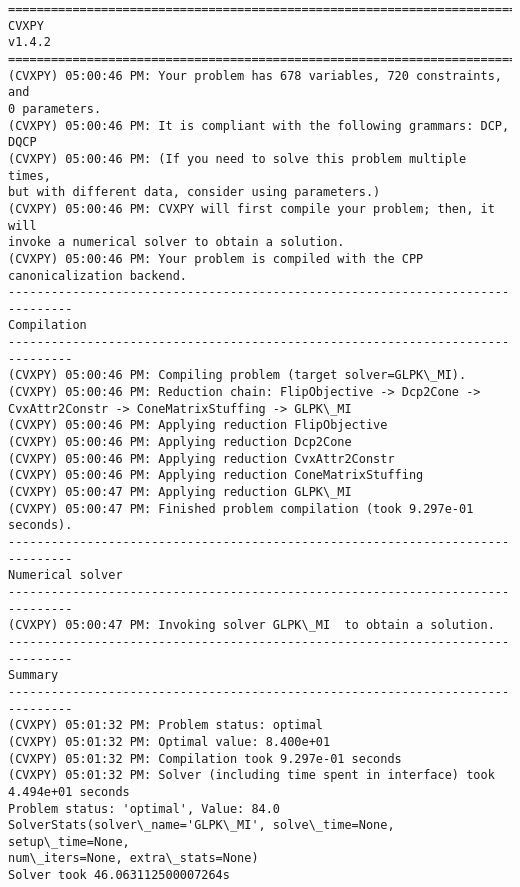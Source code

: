 \begin{Verbatim}[commandchars=\\\{\}]
===============================================================================
CVXPY
v1.4.2
===============================================================================
(CVXPY) 05:00:46 PM: Your problem has 678 variables, 720 constraints, and
0 parameters.
(CVXPY) 05:00:46 PM: It is compliant with the following grammars: DCP,
DQCP
(CVXPY) 05:00:46 PM: (If you need to solve this problem multiple times,
but with different data, consider using parameters.)
(CVXPY) 05:00:46 PM: CVXPY will first compile your problem; then, it will
invoke a numerical solver to obtain a solution.
(CVXPY) 05:00:46 PM: Your problem is compiled with the CPP
canonicalization backend.
-------------------------------------------------------------------------------
Compilation
-------------------------------------------------------------------------------
(CVXPY) 05:00:46 PM: Compiling problem (target solver=GLPK\_MI).
(CVXPY) 05:00:46 PM: Reduction chain: FlipObjective -> Dcp2Cone ->
CvxAttr2Constr -> ConeMatrixStuffing -> GLPK\_MI
(CVXPY) 05:00:46 PM: Applying reduction FlipObjective
(CVXPY) 05:00:46 PM: Applying reduction Dcp2Cone
(CVXPY) 05:00:46 PM: Applying reduction CvxAttr2Constr
(CVXPY) 05:00:46 PM: Applying reduction ConeMatrixStuffing
(CVXPY) 05:00:47 PM: Applying reduction GLPK\_MI
(CVXPY) 05:00:47 PM: Finished problem compilation (took 9.297e-01
seconds).
-------------------------------------------------------------------------------
Numerical solver
-------------------------------------------------------------------------------
(CVXPY) 05:00:47 PM: Invoking solver GLPK\_MI  to obtain a solution.
-------------------------------------------------------------------------------
Summary
-------------------------------------------------------------------------------
(CVXPY) 05:01:32 PM: Problem status: optimal
(CVXPY) 05:01:32 PM: Optimal value: 8.400e+01
(CVXPY) 05:01:32 PM: Compilation took 9.297e-01 seconds
(CVXPY) 05:01:32 PM: Solver (including time spent in interface) took
4.494e+01 seconds
Problem status: 'optimal', Value: 84.0
SolverStats(solver\_name='GLPK\_MI', solve\_time=None, setup\_time=None,
num\_iters=None, extra\_stats=None)
Solver took 46.063112500007264s
\end{Verbatim}

